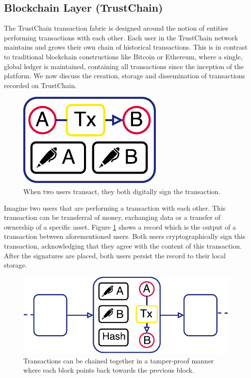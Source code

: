\documentclass[USenglish]{article}
\begin{document}
\subsection{Blockchain Layer (TrustChain)}
\label{sec:trustchain}
The TrustChain transaction fabric is designed around the notion of entities performing transactions with each other.
Each user in the TrustChain network maintains and grows their own chain of historical transactions. 
This is in contrast to traditional blockchain constructions like Bitcoin or Ethereum, where a single, global ledger is maintained, containing all transactions since the inception of the platform.
We now discuss the creation, storage and dissemination of transactions recorded on TrustChain.

\begin{figure}[h!]
	\centering
	\includegraphics[width=0.5\columnwidth]{assets/trustchain_tutorial_1}
	\caption{When two users transact, they both digitally sign the transaction.}
	\label{fig:trustchain_tutorial_1}
\end{figure}

Imagine two users that are performing a transaction with each other.
This transaction can be transferral of money, exchanging data or a transfer of ownership of a specific asset.
Figure \ref{fig:trustchain_tutorial_1} shows a record which is the output of a transaction between aforementioned users.
Both users cryptographically sign this transaction, acknowledging that they agree with the content of this transaction.
After the signatures are placed, both users persist the record to their local storage.

\begin{figure}[h!]
	\centering
	\includegraphics[width=0.5\columnwidth]{assets/trustchain_tutorial_2}
	\caption{Transactions can be chained together in a tamper-proof manner where each block points back towards the previous block.}
	\label{fig:trustchain_tutorial_2}
\end{figure}
\end{document}
